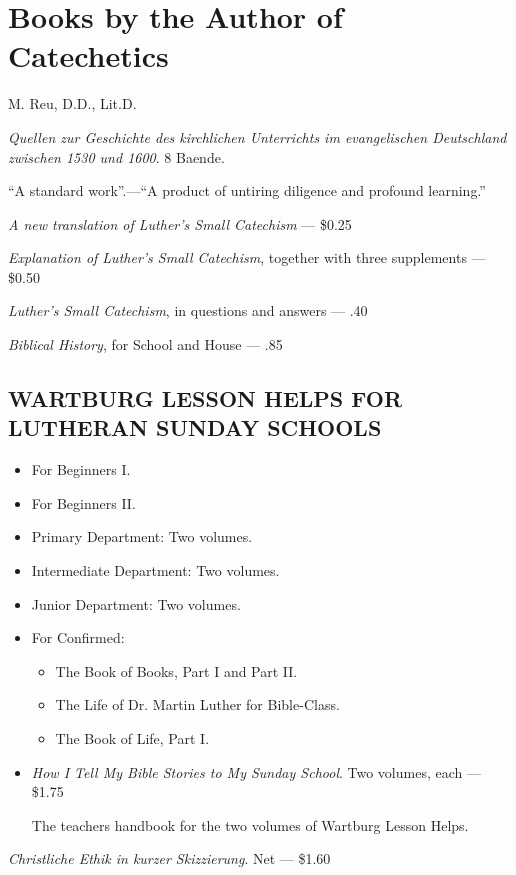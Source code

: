 \chapter{Books by the Author of Catechetics}

M. Reu, D.D., Lit.D.

\emph{Quellen zur Geschichte des kirchlichen Unterrichts im evangelischen Deutschland zwischen 1530 und 1600}. 8 Baende.

“A standard work”.—“A product of untiring diligence and profound learning.”

\emph{A new translation of Luther’s Small Catechism} — \$0.25

\emph{Explanation of Luther’s Small Catechism}, together with three supplements — \$0.50

\emph{Luther’s Small Catechism}, in questions and answers — .40

\emph{Biblical History}, for School and House — .85

\section[Wartburg Lesson Helps]{WARTBURG LESSON HELPS FOR LUTHERAN SUNDAY SCHOOLS}

\begin{itemize}
\item For Beginners I.
\item For Beginners II.
\item Primary Department: Two volumes.
\item Intermediate Department: Two volumes.
\item Junior Department: Two volumes.
\item For Confirmed:
  \begin{itemize}
  \item The Book of Books, Part I and Part II.
  \item The Life of Dr. Martin Luther for Bible-Class.
  \item The Book of Life, Part I.
  \end{itemize}
\item \emph{How I Tell My Bible Stories to My Sunday School}. Two volumes, each — \$1.75

The teachers handbook for the two volumes of Wartburg Lesson Helps.
\end{itemize}

\emph{Christliche Ethik in kurzer Skizzierung}. Net — \$1.60

